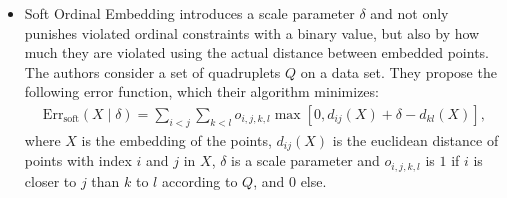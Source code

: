 \begin{itemize}
    \item Soft Ordinal Embedding  \citep[SOE,][]{teradaLocalOrdinalEmbedding2014} 
        introduces a scale parameter $\delta$ and not only punishes violated ordinal constraints
        with a binary value, but also by how much they are violated using 
        the actual distance between embedded points.
        The authors consider a set of quadruplets $Q$ on a data set. 
        They propose the following error function, which their algorithm minimizes:
        \begin{align*}
            \text{Err}_{\text{soft}}(X  \mid  \delta) = \sum_{i<j} \sum_{k<l} o_{i,j,k,l} 
            \max [0, d_{ij}(X) + \delta - d_{kl}(X)]
        ,\end{align*}
        where $X$ is the embedding of the points, $d_{ij}(X)$ is the euclidean distance 
        of points with index $i$ and $j$ in $X$, $\delta$ is a scale parameter and $o_{i,j,k,l}$
        is $1$ if $i$ is closer to $j$ than $k$ to $l$ according to $Q$, and $0$ else.


\end{itemize}
